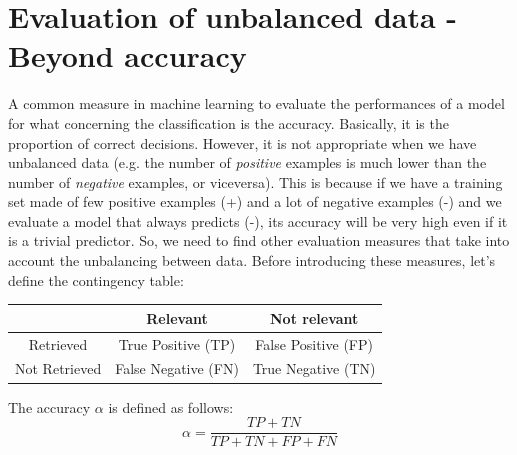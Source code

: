 \section{Evaluation of unbalanced data - Beyond accuracy}
A common measure in machine learning to evaluate the performances of a model for what concerning the classification is the accuracy. Basically, it is the proportion of correct decisions. However, it is not appropriate when we have unbalanced data (e.g. the number of \textit{positive} examples is much lower than the number of \textit{negative} examples, or viceversa). This is because if we have a training set made of few positive examples (+) and a lot of negative examples (-) and we evaluate a model that always predicts (-), its accuracy will be very high even if it is a trivial predictor. So, we need to find other evaluation measures that take into account the unbalancing between data.\newline\newline
Before introducing these measures, let's define the contingency table:
\begin{center}
    \begin{tabular}{c|c|c}
         & Relevant & Not relevant  \\
         \hline
         Retrieved & True Positive (TP) & False Positive (FP) \\
         Not Retrieved & False Negative (FN) & True Negative (TN)
    \end{tabular}
\end{center}
The accuracy $\alpha$ is defined as follows:
\[\alpha = \frac{TP + TN}{TP + TN + FP + FN}\]

